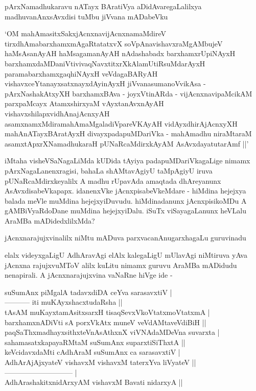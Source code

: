 pArxNamadhukaravu nATayx BAratiVya aDidAvaregaLalilxya madhuvanAnxsAvxdisi tuMbu jiVvana mADabeVku

`OM mahAmasitxSakxjAcnxnavijAcnxnamaMdireV tirxdhAmabarxhamxmAgaRtatatxvX soVpAnavishavxraMgAMbujeV haMsAsanAyAH haMsagamanAyAH nAdashabadx barxhamxrUpiNAyxH barxhamxdaMDaniVtivivaqNavxtitxrXkAlamUtiRsuMdarAyxH paramabarxhamxgaqhiNAyxH veVdagaBARyAH vishavxceYtanayxsatxnayxdAyinAyxH jiVvanasumanoVvikAsa - pArxNashakAtxyXH barxhamxBAva - joyxVtinARda - vijAcnxnavipaMcikAM parxpaMcayx AtamxshirxyaM vAyxtanAvxnAyAH vishavxshilapxvidhAnajAcnxyAH asamxnamxMdiramahAmaMgaladiVpareVKAyAH vidAyxdhirAjAcnxyXH mahAnATayxBAratAyxH divayxpadapuMDariVka - mahAmadhu niraMtaraM asamxtApxrXNamadhukaraH pUNaRcaMdirxkAyAM AsAvxdayatutarAmf ||'

iMtaha visheVSaNagaLiMda kUDida tAyiya padapuMDariVkagaLige nimamx pArxNagaLanenxragisi, bahaLa shAMtavAgiyU taMpAgiyU iruva pUNaRcaMdirxkeyalilx A madhu rUpavAda amaqtada dhAreyanunx AsAvxdisabeVkapapx. idanenxVke jAcnxpisabeVkeMdare - hiMdina hejejxya balada meVle muMdina hejejxyiDuvudu. hiMdinadanunx jAcnxpisikoMDu A gAMBiVyaRdoDane muMdina hejejxyiDalu. iSuTx viSayagaLanunx heVLalu AraMBa mADidedxlilxMda?

jAcnxnarajujxvinalilx niMtu mADuva parxvacanAnugarxhagaLu guruvinadu

elalx videyxgaLigU AdhAravAgi elAlx kalegaLigU mUlavAgi niMtiruva yAva jAcnxna rajujxvuMToV alilx kuLitu nimamx guruvu AraMBa mADidudu nenapirali. A jAcnxnarajujxvina vaNaRne hiVge ide - 

\begin{shloka}
suSumAnx piMgalA tadavxdiDA ceYva sarasavxtiV |\\
----------- iti muKAyxshacxtudaRsha ||\\

tAsAM muKayxtamAsitxsarxH tisaqSevxVkoVtatxmoVtatxmA |\\
barxhamxnADiVti sA porxVkAtx muneV veVdAMtaveVdiBiH ||\\
paqSaThxmadhayxsithxteVnAsAthxnX viVNAdaMDeVna suvarxta |\\
sahamasatxkapayaRMtaM suSumAnx suparxtiSiThxtA ||\\

keVcidavxdaMti cAdhAraM suSumAnx ca sarasavxtiV |\\
AdhArAjAjxyateV vishavxM vishavxM taterxYva liVyateV ||\\
----------------------------- |\\
AdhArashakitxnidArxyAM vishavxM Bavati nidarxyA ||
\end{shloka}

